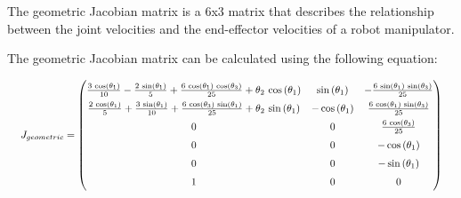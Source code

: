 \documentclass{article}
\begin{document}
The geometric Jacobian matrix is a 6x3 matrix that describes the relationship between the joint velocities and the end-effector velocities of a robot manipulator.

The geometric Jacobian matrix can be calculated using the following equation:

\begin{equation}
    \renewcommand{\arraystretch}{1.5} %
    \resizebox{\textwidth}{!}{
        $J_{geometric} = \begin{pmatrix}
                \frac{3\,\cos\left(\theta _{1}\right)}{10}-\frac{2\,\sin\left(\theta _{1}\right)}{5}+\frac{6\,\cos\left(\theta _{1}\right)\,\cos\left(\theta _{3}\right)}{25}+\theta _{2}\,\cos\left(\theta _{1}\right) & \sin\left(\theta _{1}\right)  & -\frac{6\,\sin\left(\theta _{1}\right)\,\sin\left(\theta _{3}\right)}{25} \\
                \frac{2\,\cos\left(\theta _{1}\right)}{5}+\frac{3\,\sin\left(\theta _{1}\right)}{10}+\frac{6\,\cos\left(\theta _{3}\right)\,\sin\left(\theta _{1}\right)}{25}+\theta _{2}\,\sin\left(\theta _{1}\right) & -\cos\left(\theta _{1}\right) & \frac{6\,\cos\left(\theta _{1}\right)\,\sin\left(\theta _{3}\right)}{25}  \\
                0                                                                                                                                                                                                       & 0                             & \frac{6\,\cos\left(\theta _{3}\right)}{25}                                \\
                0                                                                                                                                                                                                       & 0                             & -\cos\left(\theta _{1}\right)                                             \\
                0                                                                                                                                                                                                       & 0                             & -\sin\left(\theta _{1}\right)                                             \\
                1                                                                                                                                                                                                       & 0                             & 0
            \end{pmatrix}$
    }
\end{equation}
\end{document}
